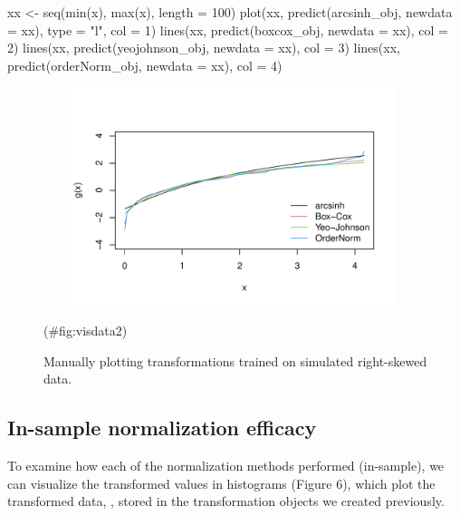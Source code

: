 \begin{Schunk}
\begin{Sinput}
xx <- seq(min(x), max(x), length = 100)
plot(xx, predict(arcsinh_obj, newdata = xx), type = "l", col = 1)
lines(xx, predict(boxcox_obj, newdata = xx), col = 2)
lines(xx, predict(yeojohnson_obj, newdata = xx), col = 3)
lines(xx, predict(orderNorm_obj, newdata = xx), col = 4)
\end{Sinput}
\end{Schunk}

\begin{Schunk}
\begin{figure}

{\centering \includegraphics[width=4.375in,height=2.5in]{figs/visdata2-1} 

}

\caption[Manually plotting transformations trained on simulated right-skewed data]{Manually plotting transformations trained on simulated right-skewed data.}(\#fig:visdata2)
\end{figure}
\end{Schunk}

\hypertarget{in-sample-normalization-efficacy}{%
\subsection{In-sample normalization
efficacy}\label{in-sample-normalization-efficacy}}

To examine how each of the normalization methods performed (in-sample),
we can visualize the transformed values in histograms (Figure 6), which
plot the transformed data, , stored in the transformation
objects we created previously.

